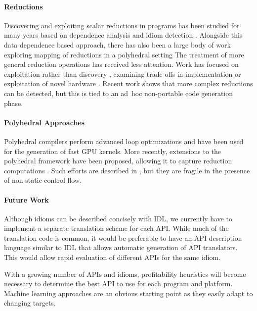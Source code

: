 {\paragraph*{Reductions}
    Discovering and exploiting scalar reductions in programs has been
    studied for many years based on dependence analysis and idiom detection
     \cite{fisher1994parallelizing,pottenger1995idiom,suganuma1996detection}.
    Alongside this data dependence based approach, there has also been a
     large body of work exploring mapping of reductions in a
     polyhedral setting \cite{jouvelot1989unified,redon1994scheduling}
     The treatment of
    more general reduction operations has received  less attention.
    Work has focused on exploitation rather than discovery
    \cite{Gutierrez:2000,gutierrez2003optimization,gutierrez2008analytical}, examining trade-offs in implementation \cite{yu2006adaptive}
     or exploitation of novel hardware \cite{ravi2010compiler,Huo2011HiPC}.
    Recent work \cite{ginsbach2017discovery} shows that more complex reductions can be 
    detected, but this is tied to  an  ad~hoc non-portable code generation phase. 

\paragraph*{Polyhedral Approaches}
    Polyhedral compilers \cite{Baskaran:2010:ACC:2175462.2175482,Verdoolaege:2013:PPC:2400682.2400713} perform advanced loop optimizations and have been used for the generation of fast GPU kernels.
    More recently, extensions to the polyhedral framework have been proposed, allowing it to capture reduction computations \cite{chi1997optimizing, gupta2006simplifying, stock2014framework}.
    Such efforts are described in \cite{Doerfert2015Polly}, but they are fragile in the presence of non static control flow.

\paragraph*{Future Work}
    Although idioms can be described concisely with IDL, we currently
    have to implement a separate translation scheme for each API. While
    much of the translation code is common, it would be preferable to have
    an API description language similar to IDL that allows automatic
    generation of API translators. This would allow rapid evaluation of
    different APIs for the same idiom.

    With a growing number of APIs and idioms, profitability heuristics
    will become necessary to determine the best API to use for each
    program and platform.  Machine learning approaches are an obvious
    starting point as they easily adapt to changing targets.

}
